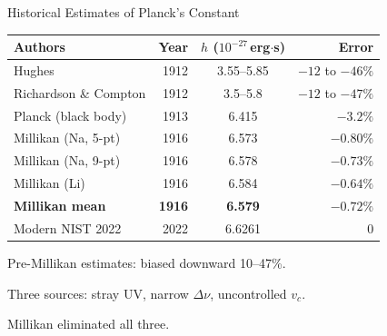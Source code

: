 \documentclass[aspectratio=169]{beamer}
\begin{document}
\begin{frame}{Historical Estimates of Planck's Constant}

\begin{center}
\begin{tabular}{p{4.4cm}rcr}
\toprule
Authors & Year & $h$ ($10^{-27}$\,erg$\cdot$s) & Error \\
\midrule
Hughes              & 1912 & 3.55--5.85        & $-12$ to $-46\%$ \\
Richardson \& Compton & 1912 & 3.5--5.8        & $-12$ to $-47\%$ \\
Planck (black body) & 1913 & 6.415             & $-3.2\%$         \\
\midrule
Millikan (Na, 5-pt) & 1916 & 6.573             & $-0.80\%$        \\
Millikan (Na, 9-pt) & 1916 & 6.578             & $-0.73\%$        \\
Millikan (Li)       & 1916 & 6.584             & $-0.64\%$        \\
\textbf{Millikan mean} & \textbf{1916} & \textbf{6.579} & $\mathbf{-0.72\%}$ \\
\midrule
Modern NIST 2022    & 2022 & 6.6261            & 0                \\
\bottomrule
\end{tabular}
\end{center}

\medskip
Pre-Millikan estimates: biased downward 10--47\%.

Three sources: stray UV, narrow $\Delta\nu$, uncontrolled $v_c$.

Millikan eliminated all three.

\end{frame}
\end{document}
